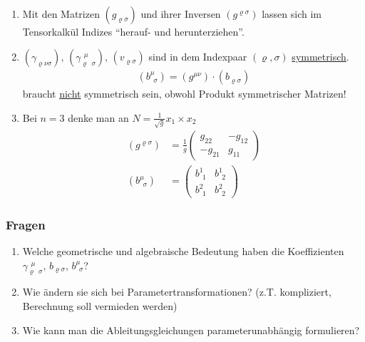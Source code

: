 \begin{bemerkung}\(\)
\begin{enumerate}
 \item Mit den Matrizen \((g_{\varrho\sigma})\) und ihrer Inversen \((g^{\varrho \sigma})\) lassen sich im Tensorkalkül Indizes "`herauf- und herunterziehen"'.
 \item \((\gamma_{\varrho\nu\sigma}),\, (\gamma_{\varrho \;\, \sigma}^{\;\,\mu}),\, (v_{\varrho \sigma})\) sind in dem Indexpaar \((\varrho, \sigma)\) \uline{symmetrisch}.
 \begin{align*}
 (b^\mu_{\;\,\sigma}) = (g^{\mu\nu}) \cdot (b_{\varrho \sigma})
 \end{align*}
 braucht \uline{nicht} symmetrisch sein, obwohl Produkt symmetrischer Matrizen!
 \item Bei \(n = 3\) denke man an \(N = \frac1{\sqrt{g}} x_1 \times x_2\)
 \begin{align*}
 (g^{\varrho \sigma}) &= \frac1g \begin{pmatrix}
                                 g_{22} & -g_{12}\\
                                 -g_{21} & g_{11}
                                \end{pmatrix} \\
 (b^\mu_{\;\,\sigma}) &= \begin{pmatrix}
                        b^1_{\;\,1} & b^1_{\;\,2} \\
                        b^2_{\;\,1} & b^2_{\;\,2}
                       \end{pmatrix}         
 \end{align*}
\end{enumerate}

\end{bemerkung}

\subsubsection*{Fragen}
\begin{enumerate}
 \item Welche geometrische und algebraische Bedeutung haben die Koeffizienten \(\gamma_{\varrho \;\, \sigma}^{\;\,\mu}, \, b_{\varrho\sigma},\, b^\mu_{\;\,\sigma}\)?
 \item Wie ändern sie sich bei Parametertransformationen? (z.T. kompliziert, Berechnung soll vermieden werden)
 \item Wie kann man die Ableitungsgleichungen parameterunabhängig formulieren?
\end{enumerate}

